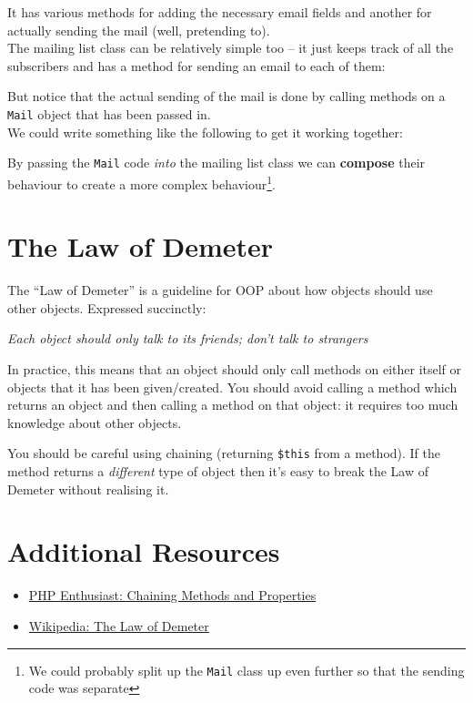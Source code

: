 
It has various methods for adding the necessary email fields and another for actually sending the mail (well, pretending to).
\\

The mailing list class can be relatively simple too – it just keeps track of all the subscribers and has a method for sending an email to each of them:


But notice that the actual sending of the mail is done by calling methods on a \texttt{Mail} object that has been passed in.
\\

We could write something like the following to get it working together:


By passing the \texttt{Mail} code \textit{into} the mailing list class we can \textbf{compose} their behaviour to create a more complex behaviour\footnote{We could probably split up the \texttt{Mail} class up even further so that the sending code was separate}.


\section{The Law of Demeter}

The ``Law of Demeter'' is a guideline for OOP about how objects should use other objects. Expressed succinctly:
\\

\begin{center}
    \textit{Each object should only talk to its friends; don't talk to strangers}
\end{center}
\par\bigskip


In practice, this means that an object should only call methods on either itself or objects that it has been given/created. You should avoid calling a method which returns an object and then calling a method on that object: it requires too much knowledge about other objects.


You should be careful using chaining (returning \texttt{\$this} from a method). If the method returns a \textit{different} type of object then it's easy to break the Law of Demeter without realising it.



\section{Additional Resources}

\begin{itemize}[leftmargin=*]
    \item \href{ https://phpenthusiast.com/object-oriented-php-tutorials/chaining-methods-and-properties}{PHP Enthusiast: Chaining Methods and Properties}
    \item \href{https://en.wikipedia.org/wiki/Law_of_Demeter}{Wikipedia: The Law of Demeter}
\end{itemize}
